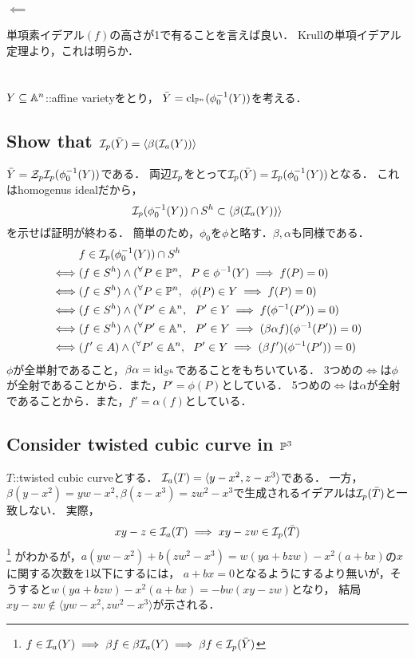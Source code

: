 \documentclass[a4paper]{jsarticle}
\begin{document}
    \paragraph{$\impliedby$}
    単項素イデアル$(f)$の高さが1で有ることを言えば良い．
    Krullの単項イデアル定理より，これは明らか．

\section{ } %
    $Y \subseteq \mathbb{A}^n$::affine varietyをとり，
    $\bar{Y}=\operatorname{cl}_{\mathbb{P}^{n}}(\phi_0^{-1}(Y))$を考える．

    \subsection{Show that $\mathcal{I}_p(\bar{Y})=\langle \beta(\mathcal{I}_a(Y)) \rangle$}
    $\bar{Y}=\mathcal{Z}_p \mathcal{I}_p(\phi_0^{-1}(Y))$である．
    両辺$\mathcal{I}_p$をとって$\mathcal{I}_p(\bar{Y})=\mathcal{I}_p(\phi_0^{-1}(Y))$となる．
    これはhomogenus idealだから，
    \[ \mathcal{I}_p(\phi_0^{-1}(Y)) \cap S^h \subset \langle \beta(\mathcal{I}_a(Y)) \rangle \]を示せば証明が終わる．
    簡単のため，$\phi_0$を$\phi$と略す．$\beta, \alpha$も同様である．
    \begin{align*}
            &   f \in \mathcal{I}_p(\phi_0^{-1}(Y)) \cap S^h \\
        \iff&   (f \in S^h) \land ({}^{\forall} P \in \mathbb{P}^n,~~ P \in \phi^{-1}(Y) \implies f(P)=0) \\
        \iff&   (f \in S^h) \land ({}^{\forall} P \in \mathbb{P}^n,~~ \phi(P) \in Y \implies f(P)=0) \\
        \iff&   (f \in S^h) \land ({}^{\forall} P' \in \mathbb{A}^n,~~ P' \in Y \implies f(\phi^{-1}(P'))=0) \\
        \iff&   (f \in S^h) \land ({}^{\forall} P' \in \mathbb{A}^n,~~ P' \in Y \implies (\beta \alpha f)(\phi^{-1}(P'))=0) \\
        \iff&   (f' \in A) \land ({}^{\forall} P' \in \mathbb{A}^n,~~ P' \in Y \implies (\beta f')(\phi^{-1}(P'))=0)
    \end{align*}
    $\phi$が全単射であること，$\beta \alpha=\mathrm{id}_{S^h}$であることをもちいている．
    3つめの$\iff$は$\phi$が全射であることから．また，$P'=\phi(P)$としている．
    5つめの$\iff$は$\alpha$が全射であることから．また，$f'=\alpha(f)$としている．

    \subsection{Consider twisted cubic curve in $\mathbb{P}^3$}
    $T$::twisted cubic curveとする．
    $\mathcal{I}_a(T)=\langle y-x^2, z-x^3 \rangle$である．
    一方，$\beta(y-x^2)=yw-x^2, \beta(z-x^3)=zw^2-x^3$で生成されるイデアルは$\mathcal{I}_p(\bar{T})$と一致しない．
    実際，\[ xy-z \in \mathcal{I}_a(T) \implies xy-zw \in \mathcal{I}_p(\bar{T})\]
    \footnote{$f \in \mathcal{I}_a(Y) \implies \beta f \in \beta \mathcal{I}_a(Y) \implies \beta f \in \mathcal{I}_p(\bar{Y})$}
    がわかるが，$a(yw-x^2)+b(zw^2-x^3)=w(ya+bzw)-x^2(a+bx)$の$x$に関する次数を1以下にするには，
    $a+bx=0$となるようにするより無いが，そうすると$w(ya+bzw)-x^2(a+bx)=-bw(xy-zw)$となり，
    結局$xy-zw \not \in \langle yw-x^2, zw^2-x^3 \rangle$が示される．
\end{document}
